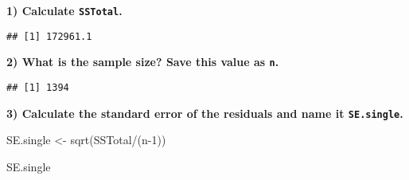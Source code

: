 \documentclass[
]{article}
\newenvironment{Shaded}{\begin{snugshade}}{\end{snugshade}}
\newcommand{\CommentTok}[1]{\textcolor[rgb]{0.56,0.35,0.01}{\textit{#1}}}
\newcommand{\DecValTok}[1]{\textcolor[rgb]{0.00,0.00,0.81}{#1}}
\newcommand{\FunctionTok}[1]{\textcolor[rgb]{0.00,0.00,0.00}{#1}}
\newcommand{\NormalTok}[1]{#1}
\newcommand{\OtherTok}[1]{\textcolor[rgb]{0.56,0.35,0.01}{#1}}
\newcommand{\SpecialCharTok}[1]{\textcolor[rgb]{0.00,0.00,0.00}{#1}}
\begin{document}
\textbf{1) Calculate \texttt{SSTotal}.} \vspace{1in}

\begin{Shaded}
\end{Shaded}

\begin{verbatim}
## [1] 172961.1
\end{verbatim}

\textbf{2) What is the sample size? Save this value as \texttt{n}.}
\vspace{1in}

\begin{Shaded}
\end{Shaded}

\begin{verbatim}
## [1] 1394
\end{verbatim}

\textbf{3) Calculate the standard error of the residuals and name it
\texttt{SE.single}.} \vspace{1in}

\begin{Shaded}
\begin{Highlighting}[]
\NormalTok{SE.single }\OtherTok{\textless{}{-}} \FunctionTok{sqrt}\NormalTok{(SSTotal}\SpecialCharTok{/}\NormalTok{(n}\DecValTok{{-}1}\NormalTok{))}

\NormalTok{SE.single}
\end{Highlighting}
\end{Shaded}
\end{document}
